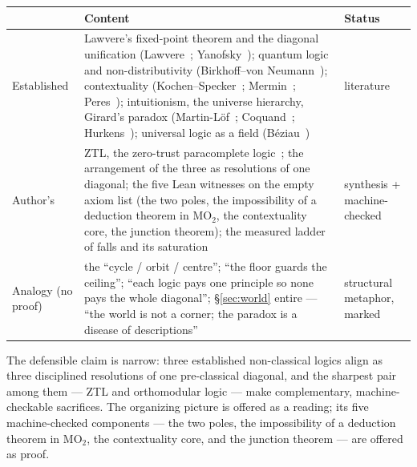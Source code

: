 \documentclass[11pt]{article}
\theoremstyle{remark}
\begin{document}
\begin{center}
\renewcommand{\arraystretch}{1.3}
\begin{tabular}{@{}>{\raggedright}p{2.4cm}p{7.7cm}>{\raggedright\arraybackslash}p{2.3cm}@{}}
\hline
 & \textbf{Content} & \textbf{Status} \\
\hline
Established & Lawvere's fixed-point theorem and the diagonal unification (Lawvere~\cite{lawvere}; Yanofsky~\cite{yanofsky}); quantum logic and non-distributivity (Birkhoff--von Neumann~\cite{bvn}); contextuality (Kochen--Specker~\cite{ks}; Mermin~\cite{mermin}; Peres~\cite{peres}); intuitionism, the universe hierarchy, Girard's paradox (Martin-L\"of~\cite{ml}; Coquand~\cite{coquand}; Hurkens~\cite{hurkens}); universal logic as a field (B\'eziau~\cite{beziau}) & literature \\
Author's & ZTL, the zero-trust paracomplete logic~\cite{ztl}; the arrangement of the three as resolutions of one diagonal; the five Lean witnesses on the empty axiom list (the two poles, the impossibility of a deduction theorem in $\mathrm{MO}_2$, the contextuality core, the junction theorem); the measured ladder of falls and its saturation & synthesis + machine-checked \\
Analogy (no proof) & the ``cycle / orbit / centre''; ``the floor guards the ceiling''; ``each logic pays one principle so none pays the whole diagonal''; \S\ref{sec:world} entire --- ``the world is not a corner; the paradox is a disease of descriptions'' & structural metaphor, marked \\
\hline
\end{tabular}
\end{center}

The defensible claim is narrow: three established non-classical logics align as
three disciplined resolutions of one pre-classical diagonal, and the sharpest
pair among them --- ZTL and orthomodular logic --- make complementary,
machine-checkable sacrifices. The organizing picture is offered as a reading;
its five machine-checked components --- the two poles, the impossibility of
a deduction theorem in $\mathrm{MO}_2$, the contextuality core, and the
junction theorem --- are offered as proof.
\end{document}
